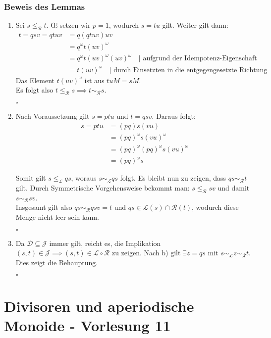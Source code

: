 \documentclass[12pt, german]{article}
\newcommand{\pom}{^{\omega}}
\newcommand{\grel}{\sim_{\mathcal{L}}}
\newcommand{\grer}{\sim_{\mathcal{R}}}
\newcommand{\lgreleq}{\leqslant_{\mathcal{L}}}
\newcommand{\lgrereq}{\leqslant_{\mathcal{R}}}
\newcommand{\bewiesen}{
	
	\begin{flushright}
		$\square$  \\
\end{flushright}}
\begin{document}
	\subsubsection{Beweis des Lemmas}
	\label{sec:dgleichj}
	\begin{enumerate}[label = \alph*)]
		\item Sei $s \lgrereq t$. \OE\hspace{1pt} setzen wir $p=1$, wodurch $s = tu$ gilt. Weiter gilt dann: 
		\begin{align*}
			t=qsv = qtuv&= q(qtuv)uv \\
			&= q\pom t(uv)\pom \\
			&= q\pom t(uv)\pom(uv)\pom \quad |\text{ aufgrund der Idempotenz-Eigenschaft}\\
			&= t(uv)\pom  \quad |\text{ durch Einsetzten in die entgegengesetzte Richtung}
		\end{align*}
	 	Das Element $t(uv)\pom$ ist aus $tuM = sM$.\\
		Es folgt also $t \lgrereq s \implies t \grer s$.
		\bewiesen
		
		\item Nach Voraussetzung gilt $s=ptu$ und $t=qsv$. Daraus folgt: 
		\begin{align*}
			s=ptu &= (pq)s(vu) \\
			&=(pq)\pom s(vu)\pom \\
			&= (pq)\pom(pq)\pom s (vu)\pom \\
			&= (pq)\pom s
		\end{align*}
		
		Somit gilt $s \lgreleq qs$, woraus $s \grel qs$ folgt. Es bleibt nun zu zeigen, dass $qs \grer t$ gilt. 
		Durch Symmetrische Vorgehensweise bekommt man: $s \lgrereq sv$ und damit
		$s \grer sv$. \\ 
		Insgesamt gilt also $qs \grer qsv = t$ und $qs \in \mathcal{L}(s) \cap \mathcal{R}(t)$, wodurch diese Menge nicht leer sein kann.
		\bewiesen
		
		\item Da $\mathcal{D} \subseteq \mathcal{J}$ immer gilt, reicht es, die Implikation $(s,t) \in \mathcal{J} \implies (s,t) \in \mathcal{L} \circ \mathcal{R}$ zu zeigen. 
		Nach b) gilt $\exists z = qs$ mit $s \grel z \grer t$. Dies zeigt die Behauptung.
		\bewiesen
	\end{enumerate}
	
	\section{Divisoren und aperiodische Monoide - Vorlesung 11}
\end{document}
